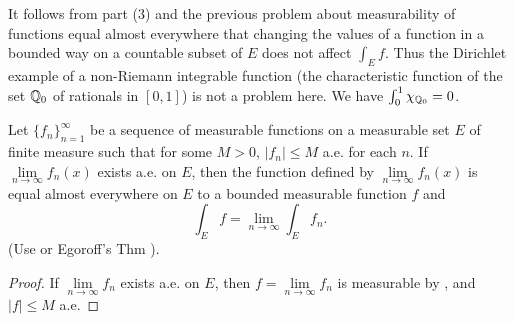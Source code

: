 \begin{rmk}%
	It follows from part (3) and the previous problem about measurability of functions equal 
	almost everywhere that changing the values of a function in a bounded way on a countable 
	subset of $E$ does not affect $\int_E f$. Thus the Dirichlet example of a non-Riemann 
	integrable function (the characteristic function of the set $\mathbb{Q}_0$ of rationals in $[0,1]$) 
	is not a problem here. We have $\int_0^1 \chi_{\mathbb{Q}_0} = 0$. 
\end{rmk}

\begin{pblm}\label{p:intofsequenceeqlimint}%
	Let $\{f_n\}_{n=1}^\infty$ be a sequence of measurable functions on a measurable set $E$ of 
	finite measure such that for some $M > 0$, $|f_n|\le M$ a.e. for each $n$. If 
	$\lim\limits_{n\to\infty}f_n(x)$ exists a.e. on $E$, then the function defined by 
	$\lim\limits_{n\to\infty}f_n(x)$ is equal almost everywhere on $E$ to a bounded measurable 
	function $f$ and 
	\begin{equation*}
		\int_E f = \lim\limits_{n\to\infty}\int_E f_n.
	\end{equation*}
	(Use  or Egoroff's Thm ). 
\pagebreak
\begin{proof}
	If $\lim\limits_{n\to\infty}f_n$ exists a.e. on $E$, then $f = \lim\limits_{n\to\infty} f_n$ 
	is measurable by , and $|f| \le M$ a.e. 


\end{proof}
\end{pblm}

